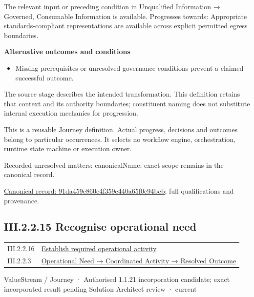 The relevant input or preceding condition in Unqualified Information → Governed, Consumable Information is available. Progresses towards: Appropriate standards-compliant representations are available across explicit permitted egress boundaries.



\par\medskip\textbf{Alternative outcomes and conditions}\par


\begin{itemize}


\item Missing prerequisites or unresolved governance conditions prevent a claimed successful outcome.

\end{itemize}


The source stage describes the intended transformation. This definition retains that context and its authority boundaries; constituent naming does not substitute internal execution mechanics for progression.



This is a reusable Journey definition. Actual progress, decisions and outcomes belong to particular occurrences. It selects no workflow engine, orchestration, runtime state machine or execution owner.


{\small Recorded unresolved matters: canonicalName; exact scope remains in the canonical record.}\par
{\footnotesize \href{../../../../continuum/strategy/value-stream/91da459e860e4f359e440a65f0c94bcb.md}{Canonical record: 91da459e860e4f359e440a65f0c94bcb}; full qualifications and provenance.}\par
\subsection*{III.2.2.15 Recognise operational need}
\label{navigation:III.2.2.15}

\begin{longtable}{p{.22\linewidth}p{.73\linewidth}}
III.2.2.16 & \hyperref[element:a3d8f16b4c69430e9024f002bdfb6c86]{Establish required operational activity} \\
III.2.2.3 & \hyperref[element:beea615ca7b34bbcbd0ad3a2a6ab2cff]{Operational Need → Coordinated Activity → Resolved Outcome} \\
\end{longtable}
\label{element:843798840da0410499908004459d1fbd}
{\small ValueStream / Journey · Authorised 1.1.21 incorporation candidate; exact incorporated result pending Solution Architect review · current}\par


